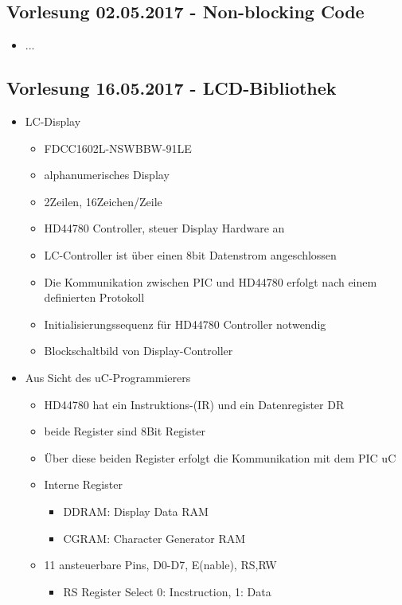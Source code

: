 \subsection{Vorlesung 02.05.2017 - Non-blocking Code}
\begin{itemize}
	\item ...
\end{itemize}

\subsection{Vorlesung 16.05.2017 - LCD-Bibliothek}
\begin{itemize}
	\item LC-Display
	\begin{itemize}
		\item FDCC1602L-NSWBBW-91LE
		\item alphanumerisches Display
		\item 2Zeilen, 16Zeichen/Zeile
		\item HD44780 Controller, steuer Display Hardware an
		\item LC-Controller ist über einen 8bit Datenstrom angeschlossen
		\item Die Kommunikation zwischen PIC und HD44780 erfolgt nach einem definierten Protokoll
		\item Initialisierungssequenz für HD44780 Controller notwendig
		\item Blockschaltbild von Display-Controller
	\end{itemize}
	\item Aus Sicht des uC-Programmierers
	\begin{itemize}
		\item HD44780 hat ein Instruktions-(IR) und ein Datenregister DR
		\item beide Register sind 8Bit Register
		\item Über diese beiden Register erfolgt die Kommunikation mit dem PIC uC
		\item Interne Register
		\begin{itemize}
			\item DDRAM: Display Data RAM
			\item CGRAM: Character Generator RAM
		\end{itemize}			
		\item 11 ansteuerbare Pins, D0-D7, E(nable), RS,RW
		\begin{itemize}
			\item RS Register Select 0: Incstruction, 1: Data

\end{itemize}
\end{itemize}
\end{itemize}
